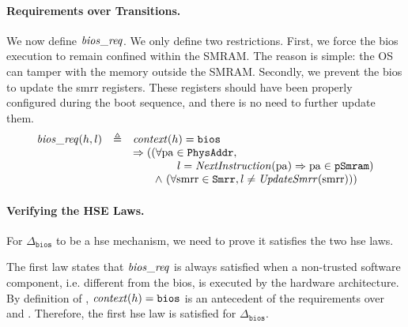 
\paragraph{Requirements over Transitions.}
%
We now define $\mathit{bios\_req}$.
%
We only define two restrictions.
%
First, we force the \ac{bios} execution to remain confined within the SMRAM.
%
The reason is simple: the OS can tamper with the memory outside the SMRAM.
%
Secondly, we prevent the \ac{bios} to update the \ac{smrr} registers.
%
These registers should have been properly configured during the boot sequence,
and there is no need to further update them.
%
\[
  \begin{array}{rcl}
    \func{bios\_req}(h, l)
    & \triangleq
    & \func{context}(h) = \val{bios} \\
    & %
    & \Rightarrow ((\forall \var{pa} \in \texttt{PhysAddr}, \\
    & %
    & \qquad\qquad l = \func{NextInstruction}(\var{pa})
      \Rightarrow \var{pa} \in \texttt{pSmram}) \\
    & %
    & \qquad\wedge~(\forall \var{smrr} \in \texttt{Smrr}, l \neq \func{UpdateSmrr}(\var{smrr})))
  \end{array}
\]

\paragraph{Verifying the HSE Laws.}
%
For $\Delta_{\mathtt{bios}}$ to be a \ac{hse} mechanism, we need to prove it
satisfies the two \ac{hse} laws.

The first law states that \( \mathit{bios\_req} \) is always satisfied when a
non-trusted software component, i.e. different from the \ac{bios}, is executed
by the hardware architecture.
%
By definition of , \( \mathit{context}(h) = \mathtt{bios} \) is an
antecedent of the requirements over  and
.
%
Therefore, the first \ac{hse} law is satisfied for \( \Delta_{\mathtt{bios}} \).

